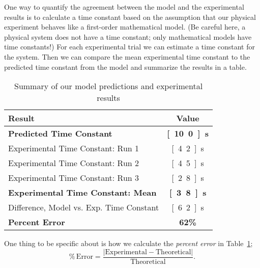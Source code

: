 One way to quantify the agreement between the model and the experimental results is to calculate a time constant based on the assumption that our physical experiment behaves like a first-order mathematical model. (Be careful here, a physical system does not have a time constant; only mathematical models have time constants!)  For each experimental trial we can estimate a time constant for the system.  Then we can compare the mean experimental time constant to the predicted time constant from the model and summarize the results in a table.
\begin{table}[bt!] 
\renewcommand{\arraystretch}{1.2}
\caption{Summary of our model predictions and experimental results}
\label{t:timec}
\centering
\begin{tabular}{|l|c|}\hline
Result & Value \\ \hline \hline
\textbf{Predicted Time Constant} & \textbf{\unit[10.0]{s}} \\ \hline
Experimental Time Constant: Run 1 & \unit[4.2]{s} \\ \hline
Experimental Time Constant: Run 2 & \unit[4.5]{s} \\ \hline
Experimental Time Constant: Run 3 & \unit[2.8]{s} \\ \hline
\textbf{Experimental Time Constant: Mean} & \textbf{\unit[3.8]{s}} \\ \hline
Difference, Model vs. Exp. Time Constant & \unit[6.2]{s} \\ \hline
\textbf{Percent Error} & \textbf{62\%} \\ \hline
\end{tabular}
\end{table}

One thing to be specific about is how we calculate the \emph{percent error} in Table~\ref{t:timec};
\[
\%\,\mathrm{Error}=\frac{|\mathrm{Experimental}-\mathrm{Theoretical}|}{\mathrm{Theoretical}}.
\]
